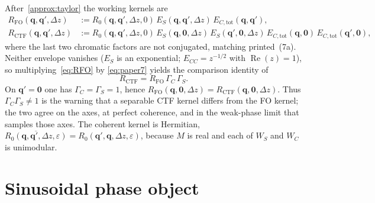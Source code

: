 \documentclass[11pt,a4paper]{article}
\theoremstyle{definition}
\theoremstyle{remark}
\DeclareMathOperator{\ReOp}{Re}
\newcommand{\conj}[1]{\overline{#1}}
\newcommand{\Dz}{\Delta z}
\newcommand{\EStot}{E_{S}}
\newcommand{\ECtot}{E_{C,\mathrm{tot}}}
\newcommand{\ECC}{E_{CC}}
\newcommand{\RFO}{R_{\mathrm{FO}}}
\newcommand{\RCTF}{R_{\mathrm{CTF}}}
\newcommand{\Rzero}{R_{0}}
\begin{document}
After~\cref{approx:taylor} the working kernels are
\begin{align}
\RFO(\mathbf{q},\mathbf{q}',\Dz)
&:=\Rzero(\mathbf{q},\mathbf{q}',\Dz,0)\,
\EStot(\mathbf{q},\mathbf{q}',\Dz)\,
\ECtot(\mathbf{q},\mathbf{q}'),
\label{eq:RFO}\\
\RCTF(\mathbf{q},\mathbf{q}',\Dz)
&:=\Rzero(\mathbf{q},\mathbf{q}',\Dz,0)\,
\EStot(\mathbf{q},\mathbf{0},\Dz)\,
\EStot(\mathbf{q}',\mathbf{0},\Dz)\,
\ECtot(\mathbf{q},\mathbf{0})\,
\ECtot(\mathbf{q}',\mathbf{0}),
\label{eq:RCTF}
\end{align}
where the last two chromatic factors are not conjugated, matching
printed~(7a).
Neither envelope vanishes ($\EStot$ is an exponential;
$\ECC=z^{-1/2}$ with $\ReOp(z)=1$), so multiplying~\eqref{eq:RFO} by
\eqref{eq:paper7} yields the comparison identity of~\cite{Yu2019}
\begin{equation}
\label{eq:R-gamma}
\RCTF=\RFO\,\Gamma_C\,\Gamma_S.
\end{equation}
On $\mathbf{q}'=\mathbf{0}$ one has $\Gamma_C=\Gamma_S=1$, hence
$\RFO(\mathbf{q},\mathbf{0},\Dz)=\RCTF(\mathbf{q},\mathbf{0},\Dz)$.
Thus $\Gamma_C\Gamma_S\neq 1$ is the warning that a separable CTF
kernel differs from the FO kernel; the two agree on the axes, at
perfect coherence, and in the weak-phase limit that samples those
axes.
The coherent kernel is Hermitian,
$\conj{\Rzero(\mathbf{q},\mathbf{q}',\Dz,\varepsilon)}
=\Rzero(\mathbf{q}',\mathbf{q},\Dz,\varepsilon)$,
because $M$ is real and each of $W_S$ and $W_C$ is unimodular.

\section{Sinusoidal phase object}
\label{sec:jacobi}
\end{document}

